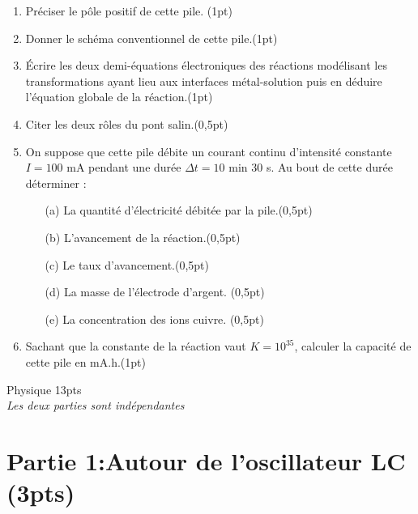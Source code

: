 \documentclass[12pt]{article}
\begin{document}
\begin{enumerate}
  \item  Préciser le pôle positif de cette pile. \dotfill(1pt)

  \item  Donner le schéma conventionnel de cette pile.\dotfill(1pt)

  \item  Écrire les deux demi-équations électroniques des réactions modélisant les transformations ayant lieu aux interfaces métal-solution puis en déduire l'équation globale de la réaction.\dotfill(1pt)

  \item Citer les deux rôles du pont salin.\dotfill(0,5pt)

  \item On suppose que cette pile débite un courant continu d'intensité constante $I = 100$ mA pendant une durée $\Delta t = 10$ min 30 s. Au bout de cette durée déterminer :

    \begin{itemize}
        \item[(a)] La quantité d'électricité débitée par la pile.\dotfill(0,5pt)
        \item[(b)] L'avancement de la réaction.\dotfill(0,5pt)
        \item[(c)] Le taux d’avancement.\dotfill (0,5pt)
        \item[(d)] La masse de l’électrode d’argent. \dotfill(0,5pt)
        \item[(e)] La concentration des ions cuivre. \dotfill(0,5pt)
    \end{itemize}


  \item Sachant que la constante de la réaction vaut $K = 10^{35}$, calculer la capacité de cette pile en mA.h.(1pt)


\end{enumerate}

\begin{center}
\hrulefill
\Large{Physique 13pts}
\hrulefill\\
    \emph{Les deux parties sont indépendantes}
\end{center}


\section*{Partie 1:Autour de l’oscillateur LC \dotfill(3pts) }
\end{document}
